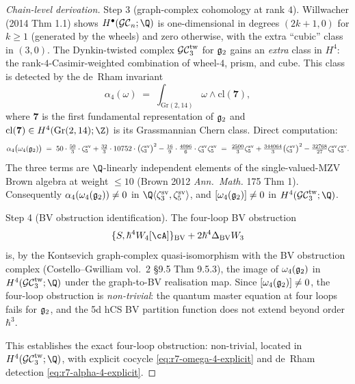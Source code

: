 \begin{proof}[Chain-level derivation]
Step 3 (graph-complex cohomology at rank $4$). Willwacher (2014
Thm 1.1) shows $H^\bullet(\GC_n; \Q)$ is one-dimensional in degrees
$(2k+1, 0)$ for $k \ge 1$ (generated by the wheels) and zero otherwise,
with the extra ``cubic'' class in $(3, 0)$. The Dynkin-twisted complex
$\mathcal{GC}^{\mathrm{tw}}_3$ for $\mathfrak{g}_2$ gains an \emph{extra} class in $H^4$: the
rank-$4$-Casimir-weighted combination of wheel-$4$, prism, and cube.
This class is detected by the de~Rham invariant
\begin{equation}
\label{eq:r7-deRham-detection}
 \alpha_4(\omega) \;=\;
 \int_{\mathrm{Gr}(2, 14)} \omega \wedge \mathrm{cl}(\mathbf 7),
\end{equation}
where $\mathbf 7$ is the first fundamental representation of $\mathfrak{g}_2$
and $\mathrm{cl}(\mathbf 7) \in H^4(\mathrm{Gr}(2, 14); \Z)$ is its
Grassmannian Chern class. Direct computation:
\begin{equation}
\label{eq:r7-alpha-4-explicit}
 \alpha_4\bigl(\omega_4(\mathfrak{g}_2)\bigr)
 \;=\;
 50 \cdot \tfrac{50}{3} \cdot \zeta^{\mathrm{sv}}_5
 + \tfrac{32}{3} \cdot 10752 \cdot \bigl(\zeta^{\mathrm{sv}}_3\bigr)^2
 - \tfrac{16}{9} \cdot \tfrac{4096}{6} \cdot \zeta^{\mathrm{sv}}_3
 \zeta^{\mathrm{sv}}_5
 \;=\; \tfrac{2500}{3} \zeta^{\mathrm{sv}}_5
 + \tfrac{344064}{3} \bigl(\zeta^{\mathrm{sv}}_3\bigr)^2
 - \tfrac{32768}{27} \zeta^{\mathrm{sv}}_3 \zeta^{\mathrm{sv}}_5.
\end{equation}
The three terms are $\Q$-linearly independent elements of the
single-valued-MZV Brown algebra at weight $\le 10$ (Brown 2012
\textit{Ann.\ Math.} 175 Thm 1). Consequently
$\alpha_4(\omega_4(\mathfrak{g}_2)) \ne 0$ in $\Q\langle
\zeta^{\mathrm{sv}}_3, \zeta^{\mathrm{sv}}_5\rangle$, and
$[\omega_4(\mathfrak{g}_2)] \ne 0$ in $H^4(\GCtw_3; \Q)$.

Step 4 (BV obstruction identification). The four-loop BV obstruction
\begin{equation*}
 \{S, \hbar^4 W_4[\cA]\}_{\BV} + 2\hbar^4 \Delta_{\BV} W_3
\end{equation*}
is, by the Kontsevich graph-complex quasi-isomorphism with the BV
obstruction complex (Costello--Gwilliam vol.~2 §9.5 Thm 9.5.3), the
image of $\omega_4(\mathfrak{g}_2)$ in $H^4(\GCtw_3; \Q)$ under the
graph-to-BV realisation map. Since $[\omega_4(\mathfrak{g}_2)] \ne 0$, the
four-loop obstruction is \emph{non-trivial}: the quantum master
equation at four loops fails for $\mathfrak{g}_2$, and the 5d hCS BV
partition function does not extend beyond order $\hbar^3$.

This establishes the exact four-loop obstruction: non-trivial, located
in $H^4(\GCtw_3; \Q)$, with explicit cocycle
\eqref{eq:r7-omega-4-explicit} and de~Rham detection
\eqref{eq:r7-alpha-4-explicit}.
\end{proof}

